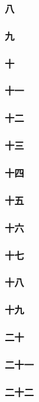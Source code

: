 \subsubsection*{八}
\subsubsection*{九}
\subsubsection*{十}
\subsubsection*{十一}
\subsubsection*{十二}
\subsubsection*{十三}
\subsubsection*{十四}
\subsubsection*{十五}
\subsubsection*{十六}
\subsubsection*{十七}
\subsubsection*{十八}
\subsubsection*{十九}
\subsubsection*{二十}
\subsubsection*{二十一}
\subsubsection*{二十二}
